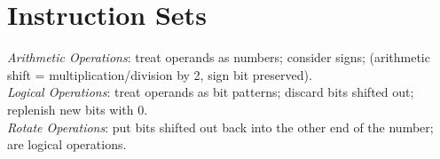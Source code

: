 \section{Instruction Sets}

\emph{Arithmetic Operations}: treat operands as numbers; consider signs;
(\eg arithmetic shift = multiplication/division by 2, sign bit preserved).\\
\emph{Logical Operations}: treat operands as bit patterns; discard bits shifted out;
replenish new bits with 0.\\
\emph{Rotate Operations}: put bits shifted out back into the other end of the number;
are logical operations.\\